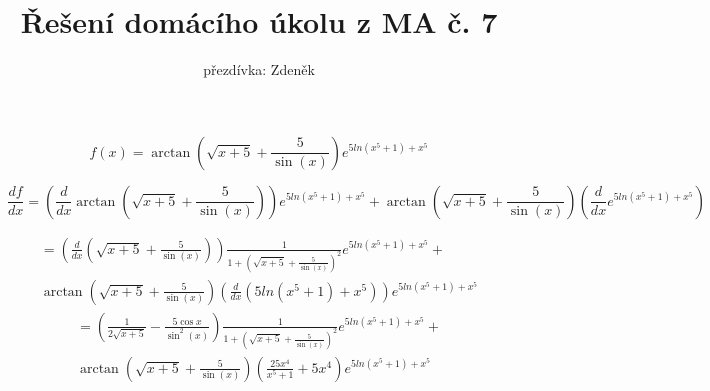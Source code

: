\documentclass[10pt,a4paper]{article}
\title{Řešení domácího úkolu z MA č. 7}
\author{přezdívka: Zdeněk}
\date{}
\theoremstyle{plain}
\theoremstyle{definition}
\begin{document}
\maketitle

\section{}

\[ f(x) = \arctan\left(\sqrt{x+5}+ \frac5{\sin(x)}\right) e^{5 ln(x^5 + 1) + x^5} \]

\[ \frac{df}{dx} = \left(\frac{d}{dx} \arctan\left(\sqrt{x+5}+ \frac5{\sin(x)}\right)\right)e^{5 ln(x^5 + 1) + x^5} +  \arctan\left(\sqrt{x+5}+ \frac5{\sin(x)}\right)\left(\frac{d}{dx}e^{5 ln(x^5 + 1) + x^5}\right) \]

\begin{align*}
=\left(\frac{d}{dx} \left(\sqrt{x+5}+ \frac5{\sin(x)}\right)\right)\frac{1}{1+ \left( \sqrt{x+5}+ \frac5{\sin(x)} \right)^2}e^{5 ln(x^5 + 1) + x^5} + \\ \arctan\left(\sqrt{x+5}+ \frac5{\sin(x)}\right)\left(\frac{d}{dx} (5 ln(x^5 + 1) + x^5) \right)e^{5 ln(x^5 + 1) + x^5} 
\end{align*}
\begin{align*}
= \left(\frac1{2\sqrt{x+5}} - \frac{5\cos x}{\sin^2(x)}\right)\frac{1}{1+ \left( \sqrt{x+5}+ \frac5{\sin(x)} \right)^2}e^{5 ln(x^5 + 1) + x^5} + \\ \arctan\left(\sqrt{x+5}+ \frac5{\sin(x)}\right)\left(\frac{25x^4}{x^5+1} + 5x^4 \right)e^{5 ln(x^5 + 1) + x^5}
\end{align*}

\section{}
\end{document}

